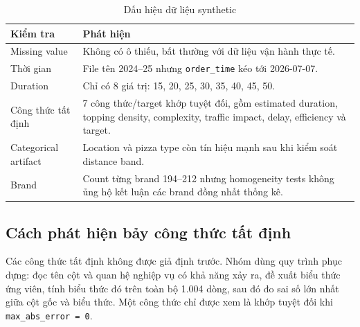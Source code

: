 \documentclass[12pt,a4paper,oneside]{report}
\newcommand{\code}[1]{\nolinkurl{#1}}
\begin{document}
\begin{table}[H]
\centering
\caption{Dấu hiệu dữ liệu synthetic}
\label{tab:realism}
\begin{tabularx}{\textwidth}{p{4.2cm}X}
\toprule
Kiểm tra & Phát hiện\\
\midrule
Missing value & Không có ô thiếu, bất thường với dữ liệu vận hành thực tế.\\
Thời gian & File tên 2024--25 nhưng \code{order\_time} kéo tới 2026-07-07.\\
Duration & Chỉ có 8 giá trị: 15, 20, 25, 30, 35, 40, 45, 50.\\
Công thức tất định & 7 công thức/target khớp tuyệt đối, gồm estimated duration,
topping density, complexity, traffic impact, delay, efficiency và target.\\
Categorical artifact & Location và pizza type còn tín hiệu mạnh sau khi kiểm
soát distance band.\\
Brand & Count từng brand 194--212 nhưng homogeneity tests không ủng hộ kết luận
các brand đồng nhất thống kê.\\
\bottomrule
\end{tabularx}
\end{table}

\subsection{Cách phát hiện bảy công thức tất định}

Các công thức tất định không được giả định trước. Nhóm dùng quy trình phục dựng:
đọc tên cột và quan hệ nghiệp vụ có khả năng xảy ra, đề xuất biểu thức ứng
viên, tính biểu thức đó trên toàn bộ 1.004 dòng, sau đó đo sai số lớn nhất
giữa cột gốc và biểu thức. Một công thức chỉ được xem là khớp tuyệt đối khi
\code{max\_abs\_error = 0}.
\end{document}
